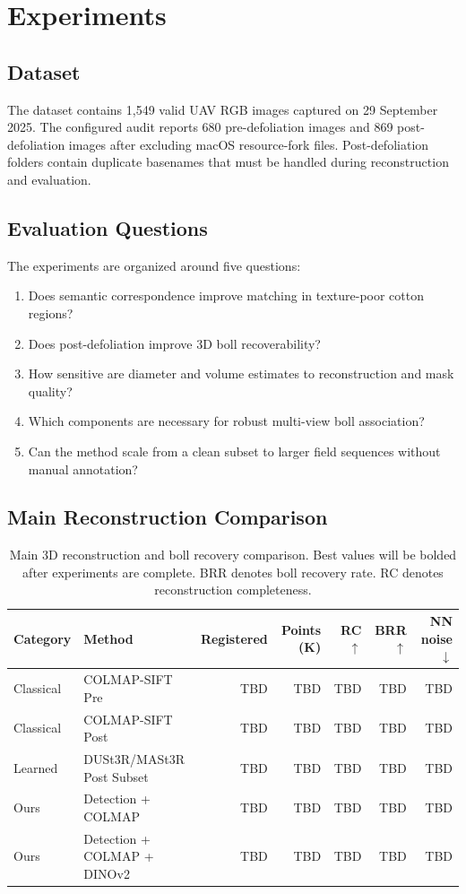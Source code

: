 \section{Experiments}

\subsection{Dataset}

The dataset contains 1,549 valid UAV RGB images captured on 29 September 2025. The configured audit reports 680 pre-defoliation images and 869 post-defoliation images after excluding macOS resource-fork files. Post-defoliation folders contain duplicate basenames that must be handled during reconstruction and evaluation.

\subsection{Evaluation Questions}

The experiments are organized around five questions:
\begin{enumerate}
    \item Does semantic correspondence improve matching in texture-poor cotton regions?
    \item Does post-defoliation improve 3D boll recoverability?
    \item How sensitive are diameter and volume estimates to reconstruction and mask quality?
    \item Which components are necessary for robust multi-view boll association?
    \item Can the method scale from a clean subset to larger field sequences without manual annotation?
\end{enumerate}

\subsection{Main Reconstruction Comparison}

\begin{table}[t]
\centering
\caption{Main 3D reconstruction and boll recovery comparison. Best values will be bolded after experiments are complete. BRR denotes boll recovery rate. RC denotes reconstruction completeness.}
\label{tab:main_reconstruction}
\begin{tabular}{llrrrrr}
\toprule
Category & Method & Registered & Points (K) & RC $\uparrow$ & BRR $\uparrow$ & NN noise $\downarrow$ \\
\midrule
Classical & COLMAP-SIFT Pre & TBD & TBD & TBD & TBD & TBD \\
Classical & COLMAP-SIFT Post & TBD & TBD & TBD & TBD & TBD \\
Learned & DUSt3R/MASt3R Post Subset & TBD & TBD & TBD & TBD & TBD \\
Ours & Detection + COLMAP & TBD & TBD & TBD & TBD & TBD \\
Ours & Detection + COLMAP + DINOv2 & TBD & TBD & TBD & TBD & TBD \\
\bottomrule
\end{tabular}
\end{table}

